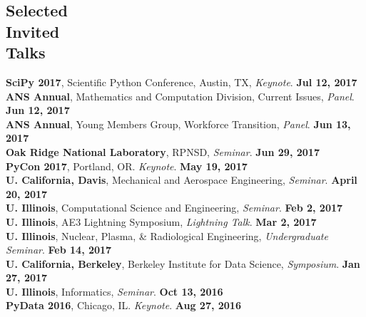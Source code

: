 \documentclass[margin,line]{resume}
\begin{document}
\begin{resume}
    \section{\mysidestyle Selected\\Invited\\Talks}
      \textbf{SciPy 2017}, Scientific Python Conference, Austin, TX, \emph{Keynote}.  \hfill\textbf{Jul 12, 2017}\\
      \textbf{ANS Annual}, Mathematics and Computation Division, Current Issues, \emph{Panel}.  \hfill\textbf{Jun 12, 2017}\\
      \textbf{ANS Annual}, Young Members Group, Workforce Transition, \emph{Panel}.  \hfill\textbf{Jun 13, 2017}\\
      \textbf{Oak Ridge National Laboratory}, RPNSD, \emph{Seminar}.  \hfill\textbf{Jun 29, 2017}\\
      \textbf{PyCon 2017}, Portland, OR. \emph{Keynote}.  \hfill\textbf{May 19, 2017}\\
      \textbf{U. California, Davis}, Mechanical and Aerospace Engineering, \emph{Seminar}.  \hfill\textbf{April 20, 2017}\\
      \textbf{U. Illinois}, Computational Science and Engineering, \emph{Seminar}.  \hfill\textbf{Feb 2, 2017}\\
      \textbf{U. Illinois}, AE3 Lightning Symposium, \emph{Lightning Talk}.  \hfill\textbf{Mar 2, 2017}\\
      \textbf{U. Illinois}, Nuclear, Plasma, \& Radiological Engineering, \emph{Undergraduate Seminar}.  \hfill\textbf{Feb 14, 2017}\\
      \textbf{U. California, Berkeley}, Berkeley Institute for Data Science, \emph{Symposium}.  \hfill\textbf{Jan 27, 2017}\\
      \textbf{U. Illinois}, Informatics, \emph{Seminar}.  \hfill\textbf{Oct 13, 2016}\\
      \textbf{PyData 2016}, Chicago, IL. \emph{Keynote}.  \hfill\textbf{Aug 27, 2016}\\

\end{resume}
\end{document}
